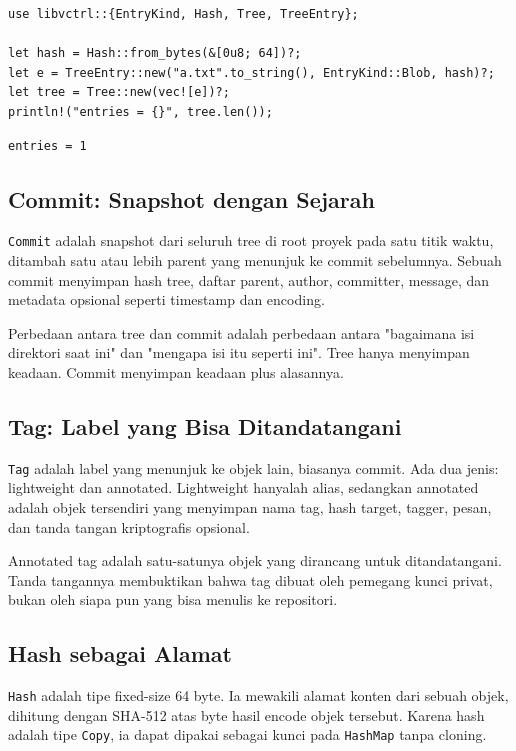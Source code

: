 \documentclass[11pt,a4paper]{article}
\begin{document}
\begin{lstlisting}[style=code]
use libvctrl::{EntryKind, Hash, Tree, TreeEntry};

let hash = Hash::from_bytes(&[0u8; 64])?;
let e = TreeEntry::new("a.txt".to_string(), EntryKind::Blob, hash)?;
let tree = Tree::new(vec![e])?;
println!("entries = {}", tree.len());
\end{lstlisting}

\begin{lstlisting}[style=out]
entries = 1
\end{lstlisting}

\subsection{Commit: Snapshot dengan Sejarah}

\texttt{Commit} adalah snapshot dari seluruh tree di root proyek pada satu titik waktu, ditambah satu atau lebih parent yang menunjuk ke commit sebelumnya. Sebuah commit menyimpan hash tree, daftar parent, author, committer, message, dan metadata opsional seperti timestamp dan encoding.

Perbedaan antara tree dan commit adalah perbedaan antara "bagaimana isi direktori saat ini" dan "mengapa isi itu seperti ini". Tree hanya menyimpan keadaan. Commit menyimpan keadaan plus alasannya.

\subsection{Tag: Label yang Bisa Ditandatangani}

\texttt{Tag} adalah label yang menunjuk ke objek lain, biasanya commit. Ada dua jenis: lightweight dan annotated. Lightweight hanyalah alias, sedangkan annotated adalah objek tersendiri yang menyimpan nama tag, hash target, tagger, pesan, dan tanda tangan kriptografis opsional.

Annotated tag adalah satu-satunya objek yang dirancang untuk ditandatangani. Tanda tangannya membuktikan bahwa tag dibuat oleh pemegang kunci privat, bukan oleh siapa pun yang bisa menulis ke repositori.

\subsection{Hash sebagai Alamat}

\texttt{Hash} adalah tipe fixed-size 64 byte. Ia mewakili alamat konten dari sebuah objek, dihitung dengan SHA-512 atas byte hasil encode objek tersebut. Karena hash adalah tipe \texttt{Copy}, ia dapat dipakai sebagai kunci pada \texttt{HashMap} tanpa cloning.
\end{document}
